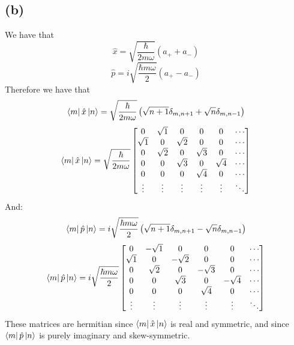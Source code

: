 \documentclass[11pt]{article}
\begin{document}
\subsection*{(b)}
We have that 
$$\hat{x}=\sqrt{\frac{\hbar}{2m\omega}}\left(
    a_{+}+a_{-}
\right)$$
$$\hat{p}=i\sqrt{\frac{\hbar m\omega}{2}}\left(
    a_{+}-a_{-}
\right)$$
Therefore we have that 
$$
\bra{m}\hat{x}\ket{n}=
\sqrt{\frac{\hbar}{2m\omega}}\left(
    \sqrt{n+1}\delta_{m,n+1}+\sqrt{n}\delta_{m,n-1}
\right)$$
$$\bra{m}\hat{x}\ket{n}=\sqrt{\frac{\hbar}{2m\omega}}
\begin{bmatrix}
    0 & \sqrt{1} & 0 & 0 & 0 & \cdots \\
    \sqrt{1} & 0 & \sqrt{2} & 0 & 0 & \cdots \\
    0 & \sqrt{2} & 0 & \sqrt{3} & 0 & \cdots \\
    0 & 0 & \sqrt{3} & 0 & \sqrt{4} & \cdots \\
    0 & 0 & 0 & \sqrt{4} & 0 & \cdots \\
    \vdots & \vdots & \vdots & \vdots & \vdots & \ddots
\end{bmatrix}$$
And:
$$
\bra{m}\hat{p}\ket{n}=
i\sqrt{\frac{\hbar m\omega}{2}}\left(
    \sqrt{n+1}\delta_{m,n+1}-\sqrt{n}\delta_{m,n-1}
\right)$$
$$
\bra{m}\hat{p}\ket{n}=
i\sqrt{\frac{\hbar m\omega}{2}}
\begin{bmatrix}
    0 & -\sqrt{1} & 0 & 0 & 0 & \cdots \\
    \sqrt{1} & 0 & -\sqrt{2} & 0 & 0 & \cdots \\
    0 & \sqrt{2} & 0 & -\sqrt{3} & 0 & \cdots \\
    0 & 0 & \sqrt{3} & 0 & -\sqrt{4} & \cdots \\
    0 & 0 & 0 & \sqrt{4} & 0 & \cdots \\
    \vdots & \vdots & \vdots & \vdots & \vdots & \ddots
\end{bmatrix}$$
These matrices are hermitian since $\bra{m}\hat{x}\ket{n}$ is real
and symmetric, and 
since $\bra{m}\hat{p}\ket{n}$ is purely imaginary and
skew-symmetric.
\end{document}
